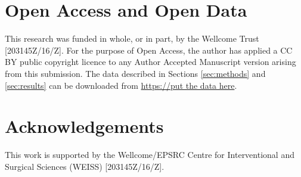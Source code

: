 \section{Open Access and Open Data}
This research was funded in whole, or in part, by the Wellcome Trust [203145Z/16/Z]. 
For the purpose of Open Access, the author has applied a CC BY public copyright licence to any Author Accepted Manuscript version arising from this submission.
The data described in Sections \ref{sec:methods} and \ref{sec:results} can be downloaded from \href{https://put the data somewhere}{https://put the data here}.


\section{Acknowledgements}
This work is supported by the Wellcome/EPSRC Centre for Interventional and Surgical Sciences (WEISS) [203145Z/16/Z].


